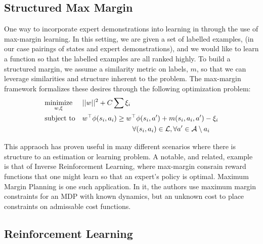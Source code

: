 \subsection{Structured Max Margin}
One way to incorporate expert demonstrations into learning in through the use of max-margin learning.
In this setting, we are given a set of labelled examples,  (in our case pairings of states and expert demonstrations), and we would 
like to learn a function so that the labelled examples are all ranked highly.
To build a structured margin, we assume a similarity metric on labels, $m$,  so that we can leverage 
similarities and structure inherent to the problem.
The max-margin framework formalizes these desires through the following optimization problem:
\begin{equation}
\begin{aligned}
& \underset{w, \xi}{\text{minimize}}  & & ||w||^2 + C\sum \xi_i\\
& \text{subject to} & &w^\top \phi(s{}_i, a{}_i) \geq w^\top \phi(s{}_i, a{}') + m(s{}_i, a{}_i, a{}') - \xi_i 
\\&&&\hspace{2.5cm}\forall (s{}_i, a{}_i) \in \mathcal{L}{}, \forall a{}' \in \mathcal{A}{}\setminus a{}_i
\end{aligned}
\end{equation}


This appraoch has proven useful in many different scenarios where there is structure to an estimation or learning problem.
A notable, and related, example is that of Inverse Reinforcement Learning, where max-margin consrain reward functions that one might learn so that an expert's policy is optimal.
Maximum Margin Planning is one such application. 
In it, the authors use maximum margin constraints for an MDP with known dynamics, but an unknown cost to place constraints on admissable cost functions.
\subsection{Reinforcement Learning}
